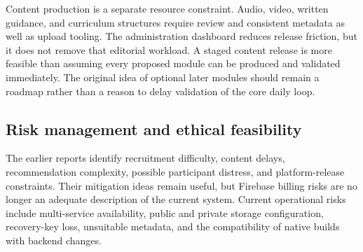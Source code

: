 Content production is a separate resource constraint. Audio, video, written guidance, and curriculum structures require review and consistent metadata as well as upload tooling. The administration dashboard reduces release friction, but it does not remove that editorial workload. A staged content release is more feasible than assuming every proposed module can be produced and validated immediately. The original idea of optional later modules should remain a roadmap rather than a reason to delay validation of the core daily loop.

\subsection{Risk management and ethical feasibility}

The earlier reports identify recruitment difficulty, content delays, recommendation complexity, possible participant distress, and platform-release constraints. Their mitigation ideas remain useful, but Firebase billing risks are no longer an adequate description of the current system. Current operational risks include multi-service availability, public and private storage configuration, recovery-key loss, unsuitable metadata, and the compatibility of native builds with backend changes.

